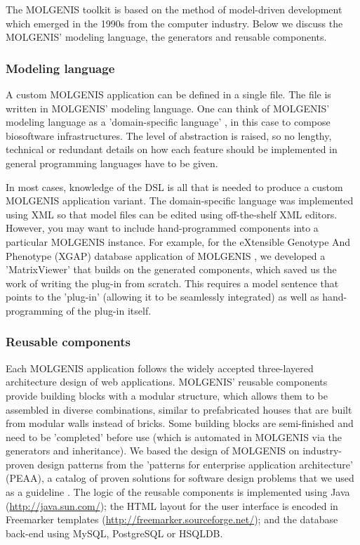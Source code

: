 The MOLGENIS toolkit is based on the method of model-driven development which emerged in the 1990s 
from the computer industry. Below we discuss the MOLGENIS' modeling language, the generators and 
reusable components. 

\subsubsection{Modeling language}
A custom MOLGENIS application can be defined in a single file. The file is written in MOLGENIS' 
modeling language. One can think of MOLGENIS' modeling language as a 'domain-specific language' 
\cite{Deursen:2002}, in this case to compose biosoftware infrastructures. The level of abstraction 
is raised, so no lengthy, technical or redundant details on how each feature should be implemented 
in general programming languages have to be given.

In most cases, knowledge of the DSL is all that is needed to produce a custom MOLGENIS application 
variant. The domain-specific language was implemented using XML so that model files can be edited 
using off-the-shelf XML editors. However, you may want to include hand-programmed components into 
a particular MOLGENIS instance. For example, for the eXtensible Genotype And Phenotype (XGAP) 
database application of MOLGENIS \cite{Swertz:2010a}, we developed a 'MatrixViewer' that builds on the generated 
components, which saved us the work of writing the plug-in from scratch. This requires a model 
sentence that points to the 'plug-in' (allowing it to be seamlessly integrated) as well as 
hand-programming of the plug-in itself.

\subsubsection{Reusable components}
Each MOLGENIS application follows the widely accepted three-layered architecture design of web 
applications. MOLGENIS' reusable components provide building blocks with a modular structure, which 
allows them to be assembled in diverse combinations, similar to prefabricated houses that are built 
from modular walls instead of bricks. Some building blocks are semi-finished and need to be 
'completed' before use (which is automated in MOLGENIS via the generators and inheritance). We based 
the design of MOLGENIS on industry-proven design patterns from the 'patterns for enterprise 
application architecture' (PEAA), a catalog of proven solutions for software design problems 
that we used as a guideline \cite{Fowler:2002}. The logic of the reusable components is implemented using 
Java (\url{http://java.sun.com/}); the HTML layout for the user interface is encoded in Freemarker 
templates (\url{http://freemarker.sourceforge.net/}); and the database back-end using MySQL, PostgreSQL 
or HSQLDB.

